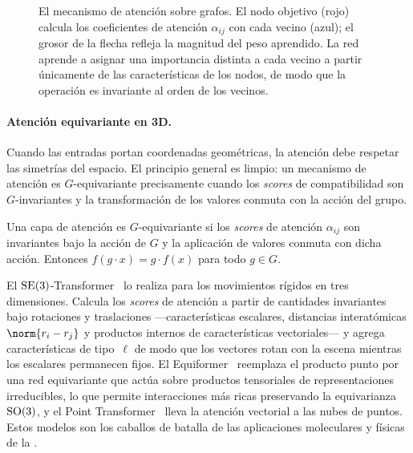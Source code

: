 \begin{figure}[h]
\caption[Mecanismo de atenci\'on sobre grafos]{El mecanismo de atenci\'on sobre
grafos. El nodo objetivo (rojo) calcula los coeficientes de atenci\'on
$\alpha_{ij}$ con cada vecino (azul); el grosor de la flecha refleja la magnitud
del peso aprendido. La red aprende a asignar una importancia distinta a cada
vecino a partir \'unicamente de las caracter\'isticas de los nodos, de modo que
la operaci\'on es invariante al orden de los vecinos.}
\label{fig:apps:gat}
\end{figure}

\paragraph{Atenci\'on equivariante en 3D.}
Cuando las entradas portan coordenadas geom\'etricas, la atenci\'on debe respetar
las simetr\'ias del espacio. El principio general es limpio: un mecanismo de
atenci\'on es $G$-equivariante precisamente cuando los \emph{scores} de
compatibilidad son $G$-invariantes y la transformaci\'on de los valores conmuta
con la acci\'on del grupo.

\begin{proposition}
\label{prop:apps:equiv-attn}
Una capa de atenci\'on es $G$-equivariante si los \emph{scores} de atenci\'on
$\alpha_{ij}$ son invariantes bajo la acci\'on de $G$ y la aplicaci\'on de
valores conmuta con dicha acci\'on. Entonces $f(g\cdot x) = g\cdot f(x)$ para
todo $g\in G$.
\end{proposition}

El $\mathrm{SE}(3)$-Transformer~\citep{fuchs2020se3transformers} lo realiza para los
movimientos r\'igidos en tres dimensiones. Calcula los \emph{scores} de
atenci\'on a partir de cantidades invariantes bajo rotaciones y traslaciones
---caracter\'isticas escalares, distancias interat\'omicas $\norm{r_i - r_j}$ y
productos internos de caracter\'isticas vectoriales--- y agrega
caracter\'isticas de tipo~$\ell$ de modo que los vectores rotan con la escena
mientras los escalares permanecen fijos. El Equiformer~\citep{liao2022equiformer}
reemplaza el producto punto por una red equivariante que act\'ua sobre productos
tensoriales de representaciones irreducibles, lo que permite interacciones m\'as
ricas preservando la equivarianza $\mathrm{SO}(3)$, y el Point
Transformer~\citep{zhao2021point} lleva la atenci\'on vectorial a las nubes de
puntos. Estos modelos son los caballos de batalla de las aplicaciones
moleculares y f\'isicas de la .

